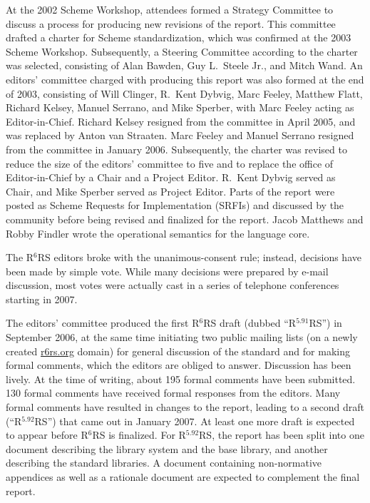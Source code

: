 \documentclass{sigplanconf}
\newcommand{\rn}[1]{R$^{#1}$RS}
\begin{document}
At the 2002 Scheme Workshop, attendees formed a Strategy Committee to
discuss a process for producing new revisions of the report.  This
committee drafted a charter for Scheme standardization, which was
confirmed at the 2003 Scheme Workshop.  Subsequently, a Steering
Committee according to the charter was selected, consisting of Alan
Bawden, Guy L.\ Steele Jr., and Mitch Wand.  An editors' committee
charged with producing this report was also formed at the end of 2003,
consisting of Will Clinger, R.\ Kent Dybvig, Marc Feeley, Matthew
Flatt, Richard Kelsey, Manuel Serrano, and Mike Sperber, with Marc
Feeley acting as Editor-in-Chief.  Richard Kelsey resigned from the
committee in April 2005, and was replaced by Anton van Straaten.  Marc
Feeley and Manuel Serrano resigned from the committee in January 2006.
Subsequently, the charter was revised to reduce the size of the
editors' committee to five and to replace the office of
Editor-in-Chief by a Chair and a Project Editor.  R.\ Kent Dybvig
served as Chair, and Mike Sperber served as Project Editor.  Parts of
the report were posted as Scheme Requests for Implementation (SRFIs)
and discussed by the community before being revised and finalized for
the report.  Jacob Matthews and Robby Findler wrote the operational
semantics for the language core.

The \rn{6} editors broke with the unanimous-consent rule; instead,
decisions have been made by simple vote.  While many decisions were
prepared by e-mail discussion, most votes were actually cast in a
series of telephone conferences starting in 2007.

The editors' committee produced the first \rn{6} draft (dubbed
``\rn{5.91}'') in September 2006, at the same time initiating two
public mailing lists (on a newly created \url{r6rs.org} domain) for general
discussion of the standard and for making formal comments, which the
editors are obliged to answer.  Discussion has been lively.  At the
time of writing, about 195 formal comments have been submitted.  130
formal comments have received formal responses from the editors.  Many
formal comments have resulted in changes to the report, leading to a
second draft (``\rn{5.92}'') that came out in January 2007.  At least one
more draft is expected to appear before \rn{6} is finalized.  For
\rn{5.92}, the report has been split into one document describing the
library system and the base library, and another describing the
standard libraries.  A document containing non-normative appendices as
well as a rationale document are expected to complement the final
report.
\end{document}
